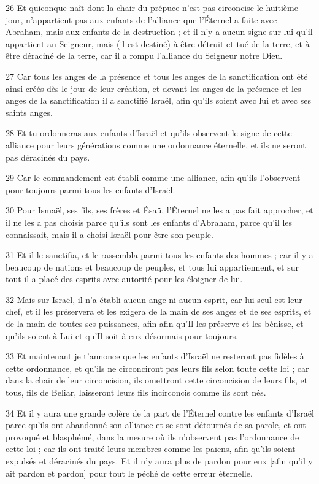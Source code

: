 \par 26 Et quiconque naît dont la chair du prépuce n'est pas circoncise le huitième jour, n'appartient pas aux enfants de l'alliance que l'Éternel a faite avec Abraham, mais aux enfants de la destruction ; et il n'y a aucun signe sur lui qu'il appartient au Seigneur, mais (il est destiné) à être détruit et tué de la terre, et à être déraciné de la terre, car il a rompu l'alliance du Seigneur notre Dieu.
\par 27 Car tous les anges de la présence et tous les anges de la sanctification ont été ainsi créés dès le jour de leur création, et devant les anges de la présence et les anges de la sanctification il a sanctifié Israël, afin qu'ils soient avec lui et avec ses saints anges.
\par 28 Et tu ordonneras aux enfants d'Israël et qu'ils observent le signe de cette alliance pour leurs générations comme une ordonnance éternelle, et ils ne seront pas déracinés du pays.
\par 29 Car le commandement est établi comme une alliance, afin qu'ils l'observent pour toujours parmi tous les enfants d'Israël.
\par 30 Pour Ismaël, ses fils, ses frères et Ésaü, l'Éternel ne les a pas fait approcher, et il ne les a pas choisis parce qu'ils sont les enfants d'Abraham, parce qu'il les connaissait, mais il a choisi Israël pour être son peuple.
\par 31 Et il le sanctifia, et le rassembla parmi tous les enfants des hommes ; car il y a beaucoup de nations et beaucoup de peuples, et tous lui appartiennent, et sur tout il a placé des esprits avec autorité pour les éloigner de lui.
\par 32 Mais sur Israël, il n'a établi aucun ange ni aucun esprit, car lui seul est leur chef, et il les préservera et les exigera de la main de ses anges et de ses esprits, et de la main de toutes ses puissances, afin afin qu'Il les préserve et les bénisse, et qu'ils soient à Lui et qu'Il soit à eux désormais pour toujours.
\par 33 Et maintenant je t'annonce que les enfants d'Israël ne resteront pas fidèles à cette ordonnance, et qu'ils ne circonciront pas leurs fils selon toute cette loi ; car dans la chair de leur circoncision, ils omettront cette circoncision de leurs fils, et tous, fils de Beliar, laisseront leurs fils incirconcis comme ils sont nés.
\par 34 Et il y aura une grande colère de la part de l'Éternel contre les enfants d'Israël parce qu'ils ont abandonné son alliance et se sont détournés de sa parole, et ont provoqué et blasphémé, dans la mesure où ils n'observent pas l'ordonnance de cette loi ; car ils ont traité leurs membres comme les païens, afin qu'ils soient expulsés et déracinés du pays. Et il n’y aura plus de pardon pour eux [afin qu’il y ait pardon et pardon] pour tout le péché de cette erreur éternelle.

